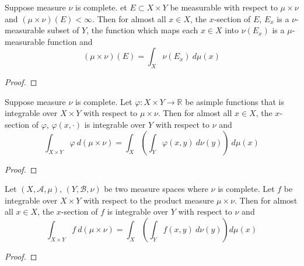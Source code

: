 \begin{theorem}
	Suppose measure $\nu$ is complete.
	et $E \subset X \times Y$ be measurable with respect to $\mu \times \nu$ and $(\mu \times \nu)(E) < \infty$.
	Then for almost all $x \in X$, the $x$-section of $E$, $E_x$ is a $\nu$-measurable subset of $Y$, the function which maps each $x \in X$ into $\nu(E_x)$ is a $\mu$-measurable function and
	\begin{equation}
		(\mu \times \nu)(E) = \int_X \nu(E_x) \ d\mu(x)
	\end{equation}
\end{theorem}
\begin{proof}
\end{proof}

\begin{theorem}
	Suppose measure $\nu$ is complete.
	Let $\varphi : X \times Y \to \mathbb{R}$ be asimple functions that is integrable over $X \times Y$ with respect to $\mu \times \nu$.
	Then for almost all $x \in X$, the $x$-section of $\varphi$, $\varphi(x,\cdot)$ is integrable over $Y$ with respect to $\nu$ and
	\begin{equation}
		\int_{X \times Y} \varphi \ d(\mu \times \nu) = \int_X \left( \int_Y  \varphi(x,y) \ d\nu(y) \right) \ d\mu(x)
	\end{equation}
\end{theorem}
\begin{proof}
\end{proof}

\begin{theorem}[Fubini]
	Let $(X,\mathcal{A},\mu)$, $(Y,\mathcal{B},\nu)$ be two measure spaces where $\nu$ is complete.
	Let $f$ be integrable over $X \times Y$ with respect to the product measure $\mu \times \nu$.
	Then for almost all $x \in X$, the $x$-section of $f$ is integrable over $Y$ with respect to $\nu$ and
	\begin{equation}
		\int_{X \times Y} f \ d(\mu \times \nu) = \int_X \left( \int_Y f(x,y) \ d\nu(y) \right) d\mu(x)
	\end{equation}
\end{theorem}
\begin{proof}
\end{proof}

